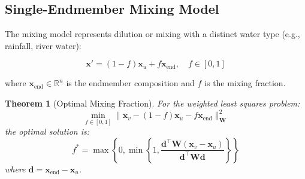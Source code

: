 \documentclass[12pt,a4paper]{article}
\theoremstyle{plain}
\newtheorem{theorem}{Theorem}[section]
\theoremstyle{definition}
\theoremstyle{remark}
\begin{document}
\subsection{Single-Endmember Mixing Model}

The mixing model represents dilution or mixing with a distinct water type (e.g., rainfall, river water):

\begin{equation}\label{eq:mixing}
	\mathbf{x}' = (1-f) \mathbf{x}_u + f \mathbf{x}_{\text{end}}, \quad f \in [0, 1]
\end{equation}

where $\mathbf{x}_{\text{end}} \in \mathbb{R}^n$ is the endmember composition and $f$ is the mixing fraction.

\begin{theorem}[Optimal Mixing Fraction]\label{thm:mixing_optimal}
	For the weighted least squares problem:
	\begin{equation}
		\min_{f \in [0,1]} \|\mathbf{x}_v - (1-f)\mathbf{x}_u - f\mathbf{x}_{\text{end}}\|_{\mathbf{W}}^2
	\end{equation}
	the optimal solution is:
	\begin{equation}\label{eq:f_optimal}
		f^* = \max\left\{0, \min\left\{1, \frac{\mathbf{d}^\top \mathbf{W} (\mathbf{x}_v - \mathbf{x}_u)}{\mathbf{d}^\top \mathbf{W} \mathbf{d}}\right\}\right\}
	\end{equation}
	where $\mathbf{d} = \mathbf{x}_{\text{end}} - \mathbf{x}_u$.
\end{theorem}
\end{document}
